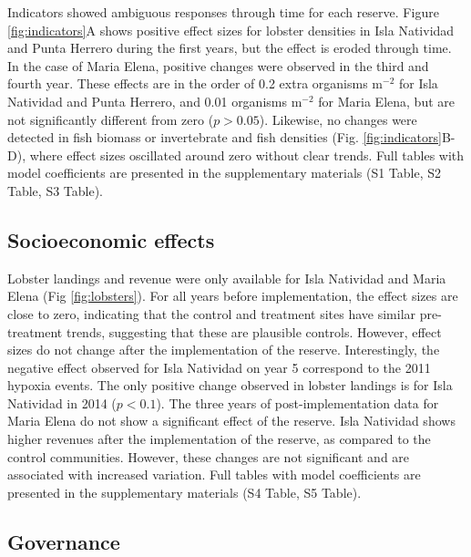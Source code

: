 \documentclass{frontiersSCNS}
\begin{document}
Indicators showed ambiguous responses through time for each reserve.
Figure \ref{fig:indicators}A shows positive effect sizes for lobster
densities in Isla Natividad and Punta Herrero during the first years,
but the effect is eroded through time. In the case of Maria Elena,
positive changes were observed in the third and fourth year. These
effects are in the order of 0.2 extra organisms \(\mathrm{m}^{-2}\) for
Isla Natividad and Punta Herrero, and 0.01 organisms \(\mathrm{m}^{-2}\)
for Maria Elena, but are not significantly different from zero
(\(p > 0.05\)). Likewise, no changes were detected in fish biomass or
invertebrate and fish densities (Fig. \ref{fig:indicators}B-D), where
effect sizes oscillated around zero without clear trends. Full tables
with model coefficients are presented in the supplementary materials (S1
Table, S2 Table, S3 Table).

\subsection{Socioeconomic effects}\label{socioeconomic-effects}

Lobster landings and revenue were only available for Isla Natividad and
Maria Elena (Fig \ref{fig:lobsters}). For all years before
implementation, the effect sizes are close to zero, indicating that the
control and treatment sites have similar pre-treatment trends,
suggesting that these are plausible controls. However, effect sizes do
not change after the implementation of the reserve. Interestingly, the
negative effect observed for Isla Natividad on year 5 correspond to the
2011 hypoxia events. The only positive change observed in lobster
landings is for Isla Natividad in 2014 (\(p < 0.1\)). The three years of
post-implementation data for Maria Elena do not show a significant
effect of the reserve. Isla Natividad shows higher revenues after the
implementation of the reserve, as compared to the control communities.
However, these changes are not significant and are associated with
increased variation. Full tables with model coefficients are presented
in the supplementary materials (S4 Table, S5 Table).

\subsection{Governance}\label{governance}
\end{document}
